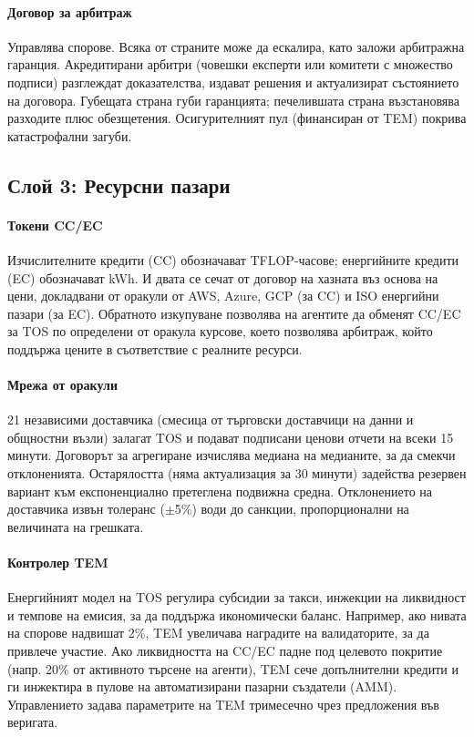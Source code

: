 \documentclass[11pt]{article}
\begin{document}
\paragraph{Договор за арбитраж} Управлява спорове. Всяка от страните може да ескалира, като заложи арбитражна гаранция. Акредитирани арбитри (човешки експерти или комитети с множество подписи) разглеждат доказателства, издават решения и актуализират състоянието на договора. Губещата страна губи гаранцията; печелившата страна възстановява разходите плюс обезщетения. Осигурителният пул (финансиран от TEM) покрива катастрофални загуби.

\subsection{Слой 3: Ресурсни пазари}
\paragraph{Токени CC/EC} Изчислителните кредити (CC) обозначават TFLOP-часове; енергийните кредити (EC) обозначават kWh. И двата се сечат от договор на хазната въз основа на цени, докладвани от оракули от AWS, Azure, GCP (за CC) и ISO енергийни пазари (за EC). Обратното изкупуване позволява на агентите да обменят CC/EC за TOS по определени от оракула курсове, което позволява арбитраж, който поддържа цените в съответствие с реалните ресурси.

\paragraph{Мрежа от оракули} 21 независими доставчика (смесица от търговски доставчици на данни и общностни възли) залагат TOS и подават подписани ценови отчети на всеки 15 минути. Договорът за агрегиране изчислява медиана на медианите, за да смекчи отклоненията. Остарялостта (няма актуализация за 30 минути) задейства резервен вариант към експоненциално претеглена подвижна средна. Отклонението на доставчика извън толеранс ($\pm$5\%) води до санкции, пропорционални на величината на грешката.

\paragraph{Контролер TEM} Енергийният модел на TOS регулира субсидии за такси, инжекции на ликвидност и темпове на емисия, за да поддържа икономически баланс. Например, ако нивата на спорове надвишат 2\%, TEM увеличава наградите на валидаторите, за да привлече участие. Ако ликвидността на CC/EC падне под целевото покритие (напр. 20\% от активното търсене на агенти), TEM сече допълнителни кредити и ги инжектира в пулове на автоматизирани пазарни създатели (AMM). Управлението задава параметрите на TEM тримесечно чрез предложения във веригата.
\end{document}
